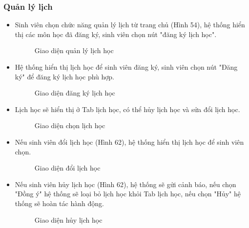 \subsubsection*{Quản lý lịch}
\begin{itemize}
    \item Sinh viên chọn chức năng quản lý lịch từ trang chủ (Hình 54), hệ thống hiển thị các môn học đã đăng ký, sinh viên chọn nút "đăng ký lịch học". 
    \begin{figure}[H]
    \centering
    \setlength{\fboxsep}{2pt}     
    \setlength{\fboxrule}{0.5pt}   
    \caption{Giao diện quản lý lịch học}
    \end{figure}
    \item Hệ thống hiển thị lịch học để sinh viên đăng ký, sinh viên chọn nút "Đăng ký" để đăng ký lịch học phù hợp.
    \begin{figure}[H]
    \centering
    \setlength{\fboxsep}{2pt}     
    \setlength{\fboxrule}{0.5pt}   
    \caption{Giao diện đăng ký lịch học}
    \end{figure}
    \item Lịch học sẽ hiển thị ở Tab lịch học, có thể hủy lịch học và sửa đổi lịch học.
    \begin{figure}[H]
    \centering
    \setlength{\fboxsep}{2pt}     
    \setlength{\fboxrule}{0.5pt}   
    \caption{Giao diện chọn lịch học}
    \end{figure}
    \item Nếu sinh viên đổi lịch học (Hình 62), hệ thống hiển thị lịch học để sinh viên chọn.
    \begin{figure}[H]
    \centering
    \setlength{\fboxsep}{2pt}     
    \setlength{\fboxrule}{0.5pt}   
    \caption{Giao diện đổi lịch học}
    \end{figure}
    \item Nếu sinh viên hủy lịch học (Hình 62), hệ thống sẽ gửi cảnh báo, nếu chọn "Đồng ý" hệ thống sẽ loại bỏ lịch học khỏi Tab lịch học, nếu chọn "Hủy" hệ thống sẽ hoàn tác hành động.
    \begin{figure}[H]
    \centering
    \setlength{\fboxsep}{2pt}     
    \setlength{\fboxrule}{0.5pt}   
    \caption{Giao diện hủy lịch học}
    \end{figure}
\end{itemize}


